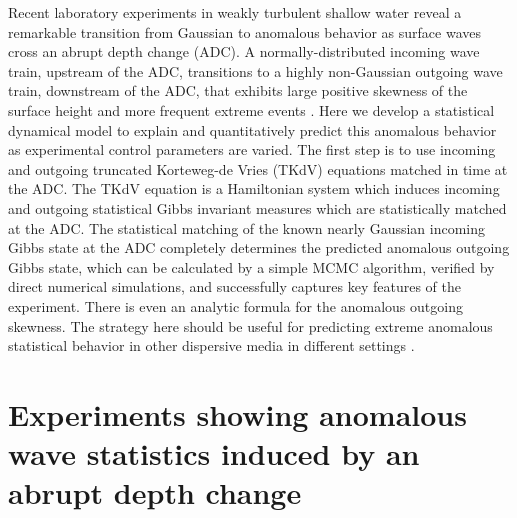 \documentclass[9pt,twocolumn,twoside,lineno]{pnas-new}
\begin{document}
Recent laboratory experiments in weakly turbulent shallow water reveal a remarkable transition from Gaussian to anomalous behavior as surface waves cross an abrupt depth change (ADC). 
A normally-distributed incoming wave train, upstream of the ADC, transitions to a highly non-Gaussian outgoing wave train, downstream of the ADC, that exhibits large positive skewness of the surface height and more frequent extreme events \cite{bolles2018anomalous}.
Here we develop a statistical dynamical model to explain and quantitatively
predict this anomalous behavior as experimental control
parameters are varied. The first step is to use incoming and outgoing
truncated Korteweg-de Vries (TKdV) equations matched in time at the
ADC. The TKdV equation is a Hamiltonian system which induces incoming
and outgoing statistical Gibbs invariant measures which are statistically
matched at the ADC. The statistical matching of the known nearly Gaussian
incoming Gibbs state at the ADC completely determines the predicted
anomalous outgoing Gibbs state, which can be calculated by a simple
MCMC algorithm, verified by direct numerical simulations, and successfully
captures key features of the experiment. There is even an analytic
formula for the anomalous outgoing skewness. The strategy here should
be useful for predicting extreme anomalous statistical behavior in
other dispersive media in different settings  \cite{solli2007optical,hohmann2010freak}.


\section{Experiments showing anomalous wave statistics induced by an abrupt depth change}

\end{document}
